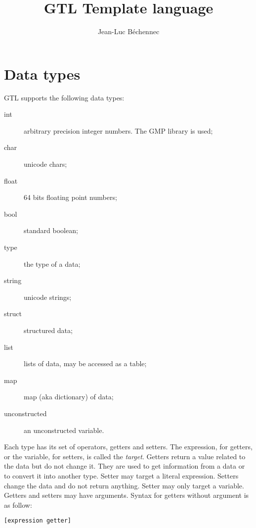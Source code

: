 \documentclass[11pt]{article}
\title{GTL Template language}
\author{Jean-Luc B\'echennec}
\begin{document}
\maketitle

\tableofcontents

\newpage
\section{Data types}

GTL supports the following data types:
\begin{description}
\item[int] arbitrary precision integer numbers. The GMP library is used;
\item[char] unicode chars;
\item[float] 64 bits floating point numbers;
\item[bool] standard boolean;
\item[type] the type of a data;
\item[string] unicode strings;
\item[struct] structured data;
\item[list] lists of data, may be accessed as a table;
\item[map] map (aka dictionary) of data;
\item[unconstructed] an unconstructed variable.
\end{description}

Each type has its set of operators, getters and setters. The expression, for getters, or the variable, for setters, is called the {\em target}. Getters return a value related to the data but do not change it. They are used to get information from a data or to convert it into another type. Setter may target a literal expression. Setters change the data and do not return anything. Setter may only target a variable. Getters and setters may have arguments. Syntax for getters without argument is as follow:

\begin{lstlisting}[language=goilTemplate]
[expression getter]
\end{lstlisting}
\end{document}
